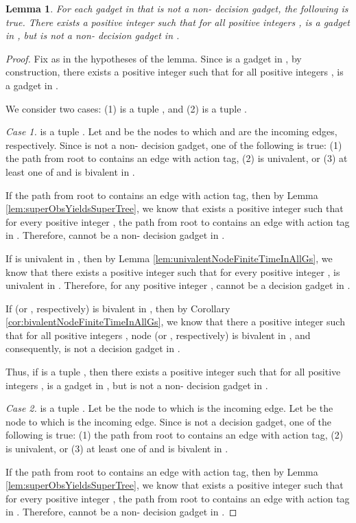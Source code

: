 \documentclass[11pt]{article}
\numberwithin{theorem}{section}
\newtheorem{lemma}[theorem]{Lemma}
\begin{document}
\begin{lemma}\label{lem:nonDecisionGadgetStableInAllGs}
For each gadget  in  that is not a non- decision gadget, the following is true.
 There exists a positive integer  such that for all positive integers ,  is a gadget in , but  is not a non- decision gadget in .
\end{lemma}
\begin{proof}
Fix  as in the hypotheses of the lemma. Since  is a gadget in , by construction, there exists a positive integer  such that for all positive integers ,  is a gadget in . 

We consider two cases: (1)  is a tuple , and (2)  is a tuple .

\emph{Case 1.}  is a tuple . 
Let  and  be the nodes to which  and  are the incoming edges, respectively.
Since  is not a non- decision gadget, one of the following is true: (1) the path from root to  contains an edge with  action tag, (2)  is univalent,  or (3) at least one of  and  is bivalent in . 

If the path from root to  contains an edge with  action tag, then by Lemma \ref{lem:superObsYieldsSuperTree}, we know that  exists a positive integer  such that for every positive integer , the path from root to  contains an edge with  action tag in . Therefore,  cannot be a non- decision gadget in .


If  is univalent in , then by Lemma \ref{lem:univalentNodeFiniteTimeInAllGs}, we know that there exists a positive integer  such that for every positive integer ,  is univalent in . Therefore, for any positive integer ,  cannot be a decision gadget in .

If  (or , respectively) is bivalent in , then by Corollary \ref{cor:bivalentNodeFiniteTimeInAllGs}, we know that there a positive integer  such that for all positive integers , node  (or , respectively) is bivalent in , and consequently,  is not a decision gadget in . 

Thus, if  is a tuple , then there exists a positive integer  such that for all positive integers ,  is a gadget in , but  is not a non- decision gadget in .

\emph{Case 2.}  is a tuple . Let  be the node to which  is the incoming edge.
Let  be the node to which  is the incoming edge. Since  is not a decision gadget, one of the following is true: (1) the path from root to  contains an edge with  action tag, (2)  is univalent,  or (3) at least one of  and  is bivalent in .

If the path from root to  contains an edge with  action tag, then by Lemma \ref{lem:superObsYieldsSuperTree}, we know that  exists a positive integer  such that for every positive integer , the path from root to  contains an edge with  action tag in . Therefore,  cannot be a non- decision gadget in .



\end{proof}
\end{document}
